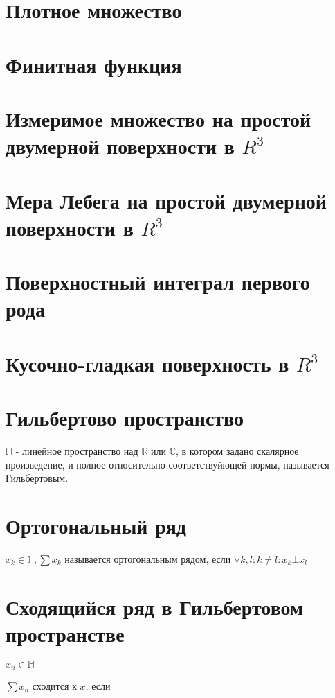 \documentclass[paper=a4, fontsize=17pt]{article}
\begin{document}
	\section{Плотное множество}
	
	\section{Финитная функция}

	\section{Измеримое множество на простой двумерной поверхности в $R^3$}
	
	\section{Мера Лебега на простой двумерной поверхности в $R^3$}
 
	\section{Поверхностный интеграл первого рода}

	\section{Кусочно-гладкая поверхность в $R^3$}

	\section{Гильбертово пространство}
	$\mathds{H}$ - линейное пространство над $\mathds{R}$ или $\mathds{C}$, в котором задано скалярное произведение, и полное относительно соответствуйющей нормы, называется Гильбертовым.
	
	\section{Ортогональный ряд}
	$x_k \in \mathds{H}, \sum x_k$ называется ортогональным рядом, если $\forall k, l: k \neq l: x_k \bot x_l$
	
	\section{Сходящийся ряд в Гильбертовом пространстве}
	$x_n \in \mathds{H}$
	
	$\sum x_n$ сходится к $x$, если
	
\end{document}
